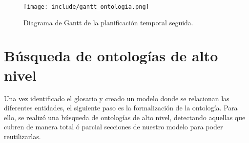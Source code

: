 \documentclass[a4paper,12pt]{article}
\begin{document}
	\begin{figure}[H]
		\centering
		\texttt{[image: include/gantt\_ontologia.png]}
		\caption{Diagrama de Gantt de la planificación temporal seguida.}
	\end{figure}
	
	\section{Búsqueda de ontologías de alto nivel}
	
	Una vez identificado el glosario y creado un modelo donde se relacionan las diferentes entidades, el siguiente paso es la formalización de la ontología. Para ello, se realizó una búsqueda de ontologías de alto nivel, detectando aquellas que cubren de manera total ó parcial secciones de nuestro modelo para poder reutilizarlas.
	
\end{document}

